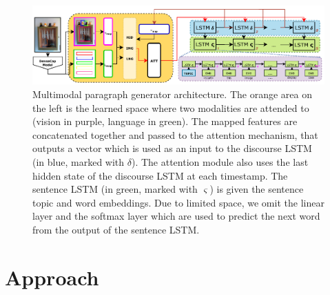 \documentclass[11pt,a4paper]{article}
\begin{document}
\begin{figure}[h]
 \includegraphics[width=\linewidth]{figures/model}
 \caption{Multimodal paragraph generator architecture.
 		The orange area on the left is the learned space where two modalities are attended to (vision in purple, language in green).
		The mapped features are concatenated together and passed to the attention mechanism, that outputs a vector which is used as an input to the discourse LSTM (in blue, marked with $\delta$).
		The attention module also uses the last hidden state of the discourse LSTM at each timestamp.
		The sentence LSTM (in green, marked with $\varsigma$) is given the sentence topic and word embeddings.
		Due to limited space, we omit the linear layer and the softmax layer which are used to predict the next word from the output of the sentence LSTM.}
 \label{fig:model}
\end{figure}

\section{Approach}
\end{document}
